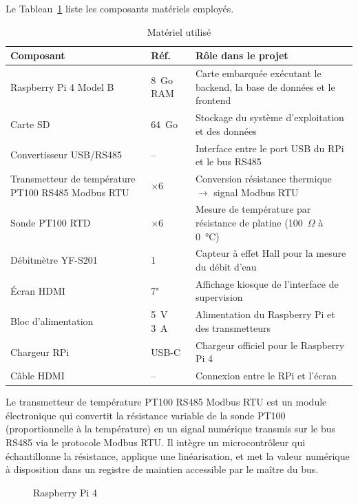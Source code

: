 Le Tableau~\ref{tab:hardware} liste les composants matériels employés.

\begin{table}[htbp]
\centering
\renewcommand{\arraystretch}{1.45}
\caption{Matériel utilisé}
\label{tab:hardware}
\begin{tabular}{|p{}|p{}|p{}|}
\hline
\rowcolor{gray!25}
\textbf{Composant} & \textbf{Réf.} & \textbf{Rôle dans le projet} \\
\hline
Raspberry Pi 4 Model B & 8~Go RAM & Carte embarquée exécutant le backend, la base de données et le frontend \\
\hline
Carte SD & 64~Go & Stockage du système d'exploitation et des données \\
\hline
Convertisseur USB/RS485 & -- & Interface entre le port USB du RPi et le bus RS485 \\
\hline
Transmetteur de température PT100 RS485 Modbus RTU & \(\times 6\) & Conversion résistance thermique \(\rightarrow\) signal Modbus RTU \\
\hline
Sonde PT100 RTD & \(\times 6\) & Mesure de température par résistance de platine (100~\(\Omega\) à 0~\si{\celsius}) \\
\hline
Débitmètre YF-S201 & 1 & Capteur à effet Hall pour la mesure du débit d'eau \\
\hline
Écran HDMI & 7" & Affichage kiosque de l'interface de supervision \\
\hline
Bloc d'alimentation & 5~V 3~A & Alimentation du Raspberry Pi et des transmetteurs \\
\hline
Chargeur RPi & USB-C & Chargeur officiel pour le Raspberry Pi 4 \\
\hline
Câble HDMI & -- & Connexion entre le RPi et l'écran \\
\hline
\end{tabular}
\end{table}

Le transmetteur de température PT100 RS485 Modbus RTU est un module électronique qui convertit la résistance variable de la sonde PT100 (proportionnelle à la température) en un signal numérique transmis sur le bus RS485 via le protocole Modbus RTU. Il intègre un microcontrôleur qui échantillonne la résistance, applique une linéarisation, et met la valeur numérique à disposition dans un registre de maintien accessible par le maître du bus.

\begin{figure}[htbp]
  \centering
  \caption{Raspberry Pi 4}
  \label{fig:photo_rpi4}
\end{figure}

